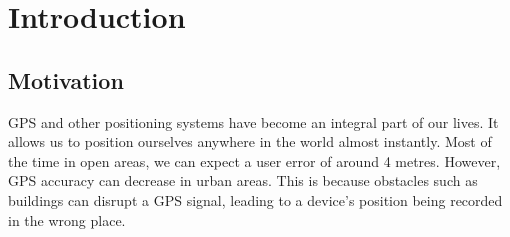 \documentclass{l4proj}
\begin{document}
%
%
%
%
%
%
%
%
\chapter{Introduction}


\section{Motivation}
GPS and other positioning systems have become an integral part of our lives. It
allows us to position ourselves anywhere in the world almost instantly. Most of
the time in open areas, we can expect a user error of around 4 metres. However, GPS
accuracy can decrease in urban areas. This is because obstacles such as buildings
can disrupt a GPS signal, leading to a device's position being recorded in the wrong place.
\end{document}
